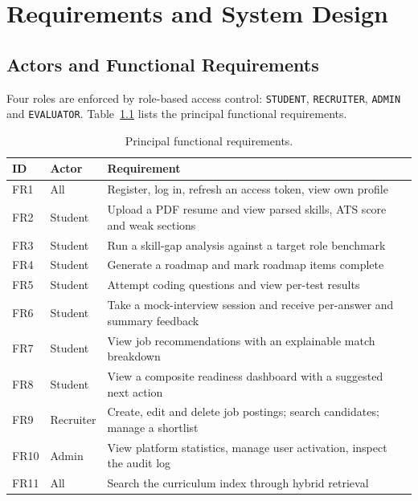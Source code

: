 \documentclass[openany]{tietreport}
\newcommand{\code}[1]{\texttt{\small #1}}
\begin{document}
\chapter{Requirements and System Design}

\section{Actors and Functional Requirements}
Four roles are enforced by role-based access control: \code{STUDENT}, \code{RECRUITER}, \code{ADMIN} and \code{EVALUATOR}. Table~\ref{tab:fr} lists the principal functional requirements.

\begin{table}[h]
\centering\small
\begin{tabularx}{\textwidth}{@{}l>{\raggedright\arraybackslash}p{0.95in}>{\raggedright\arraybackslash}X@{}}
\toprule
\textbf{ID} & \textbf{Actor} & \textbf{Requirement} \\
\midrule
FR1 & All & Register, log in, refresh an access token, view own profile \\
FR2 & Student & Upload a PDF resume and view parsed skills, ATS score and weak sections \\
FR3 & Student & Run a skill-gap analysis against a target role benchmark \\
FR4 & Student & Generate a roadmap and mark roadmap items complete \\
FR5 & Student & Attempt coding questions and view per-test results \\
FR6 & Student & Take a mock-interview session and receive per-answer and summary feedback \\
FR7 & Student & View job recommendations with an explainable match breakdown \\
FR8 & Student & View a composite readiness dashboard with a suggested next action \\
FR9 & Recruiter & Create, edit and delete job postings; search candidates; manage a shortlist \\
FR10 & Admin & View platform statistics, manage user activation, inspect the audit log \\
FR11 & All & Search the curriculum index through hybrid retrieval \\
\bottomrule
\end{tabularx}
\caption{Principal functional requirements.}
\label{tab:fr}
\end{table}
\end{document}
